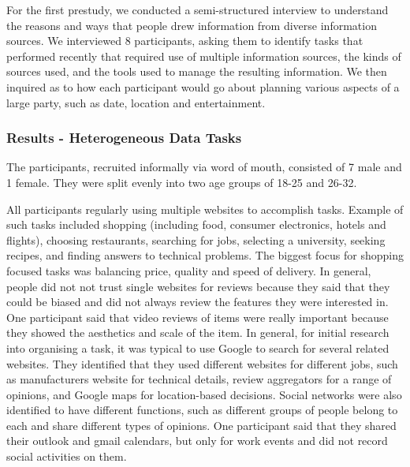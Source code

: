 \documentclass{sigchi}
\begin{document}
For the first prestudy, we conducted a semi-structured interview to understand the reasons and ways that people drew information from diverse information sources. We interviewed 8 participants, asking them to identify tasks that performed recently that required use of multiple information sources, the kinds of sources used, and the tools used to manage the resulting information.  We then inquired as to how each participant would go about planning various aspects of a large party, such as date, location and entertainment.

\subsubsection{Results - Heterogeneous Data Tasks}
The participants, recruited informally via word of mouth, consisted of 7 male and 1 female. They were split evenly into two age groups of 18-25 and 26-32.   

All participants regularly using multiple websites to accomplish tasks.  Example of such tasks included shopping (including food, consumer electronics, hotels and flights), choosing restaurants, searching for jobs, selecting a university, seeking recipes, and finding answers to technical problems.  The biggest focus for shopping focused tasks was balancing price, quality and speed of delivery.  In general, people did not not trust single websites for reviews because they said that they could be biased and did not always review the features they were interested in.  One participant said that video reviews of items were really important because they showed the aesthetics and scale of the item.  In general, for initial research into organising a task, it was typical to use Google to search for several related websites.  They identified that they used different websites for different jobs, such as manufacturers website for technical details, review aggregators for a range of opinions, and Google maps for location-based decisions.  Social networks were also identified to have different functions, such as different groups of people belong to each and share different types of opinions.  One participant said that they shared their outlook and gmail calendars, but only for work events and did not record social activities on them.
\end{document}
